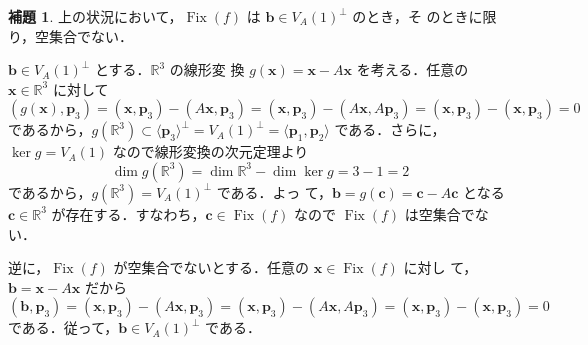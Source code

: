 \documentclass[11pt, uplatex, dvipdfmx, titlepage]{jsarticle}
\makeatletter
\DeclareMathOperator{\Fix}{Fix}
\renewenvironment{proof}[1][\proofname]{\par
  \pushQED{\qed}%
  \normalfont \topsep6\p@\@plus6\p@\relax
  \trivlist
  \item[\hskip\labelsep
         \bfseries
    {#1}]\ignorespaces
}{%
  \popQED\endtrivlist\@endpefalse
}
\theoremstyle{definition}
\newtheorem{lemma}{補題}[section]
\renewcommand{\proofname}{\textbf{証明}}
\makeatother
\begin{document}
\begin{lemma}\label{lem:RotOrSpiral3}
  上の状況において，$\Fix(f)$ は $\bm{b} \in V_A(1)^{\perp}$ のとき，そ
  のときに限り，空集合でない．
\end{lemma}

\begin{proof}
  $\bm{b} \in V_A(1)^{\perp}$ とする．$\mathbb{R}^3$ の線形変
  換 $g(\bm{x}) = \bm{x}-A\bm{x}$ を考える．任意の $\bm{x} \in
  \mathbb{R}^3$ に対して
  \[
    (g(\bm{x}), \bm{p}_3) = (\bm{x}, \bm{p}_3) - (A\bm{x}, \bm{p}_3) =
    (\bm{x}, \bm{p}_3) -(A\bm{x},A\bm{p}_3) =(\bm{x}, \bm{p}_3) -
    (\bm{x},\bm{p}_3) = 0
  \]
  であるから，$g(\mathbb{R}^3) \subset \langle \bm{p}_3
  \rangle^{\perp}=V_A(1)^{\perp}=\langle \bm{p}_1, \bm{p}_2\rangle$
  である．さらに，$\ker g = V_A(1)$ なので線形変換の次元定理より
  \[
    \dim g(\mathbb{R}^3) = \dim \mathbb{R}^3 - \dim \ker g = 3 -1 =2
  \]
  であるから，$g(\mathbb{R}^3) = V_A(1)^{\perp}$ である．よっ
  て，$\bm{b} = g(\bm{c}) = \bm{c} - A\bm{c}$ となる
  $\bm{c} \in \mathbb{R}^3$ が存在する．すなわち，$\bm{c} \in \Fix(f)$
  なので $\Fix(f)$ は空集合でない．

  逆に，$\Fix(f)$ が空集合でないとする．任意の $\bm{x} \in \Fix(f)$ に対し
  て， $\bm{b} = \bm{x} - A\bm{x}$ だから
  \[
    (\bm{b}, \bm{p}_3) = (\bm{x},\bm{p}_3) - (A\bm{x}, \bm{p}_3)
    =(\bm{x}, \bm{p}_3) - (A\bm{x}, A\bm{p}_3)
    =(\bm{x}, \bm{p}_3) - (\bm{x}, \bm{p}_3) = 0
  \]
  である．従って，$\bm{b} \in V_A(1)^{\perp}$ である．
\end{proof}
\end{document}
